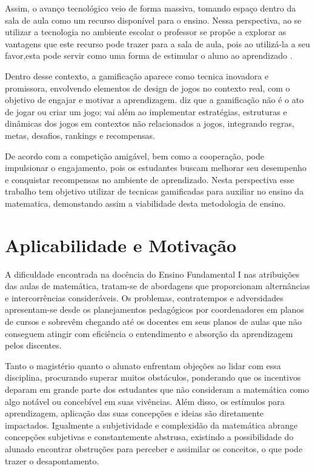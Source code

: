 Assim, o avanço tecnológico veio de forma massiva, tomando espaço dentro da sala de aula como um recurso disponível para o ensino. Nessa perspectiva, ao se utilizar a tecnologia no ambiente escolar o professor se propõe a explorar as vantagens que este recurso pode trazer para a sala de aula, pois ao utilizá-la a seu favor,esta pode servir como uma forma de estimular o aluno ao aprendizado \cite{barbosa2020utilizacao}.

Dentro desse contexto, a gamificação aparece como tecnica inovadora e promissora, envolvendo elementos de design de jogos no contexto real, com o objetivo de engajar e motivar a aprendizagem. \cite{barbosa2021aplicativos} diz que a gamificação não é o ato de jogar ou criar um jogo; vai além ao implementar estratégias, estruturas e dinâmicas dos jogos em contextos não relacionados a jogos, integrando regras, metas, desafios, rankings e recompensas.

De acordo com \cite{santana2024intencionalidade} a competição amigável, bem como a cooperação, pode impulsionar o engajamento, pois os estudantes buscam melhorar seu desempenho e conquistar recompensas no ambiente de aprendizado. Nesta perspectiva esse trabalho tem objetivo utilizar de tecnicas gamificadas para auxiliar no ensino da matematica, demonstando assim a viabilidade desta metodologia de ensino. 

\section{Aplicabilidade e Motivação}\label{chp:aplic}

A dificuldade encontrada na docência do Ensino Fundamental I nas atribuições das aulas de matemática, tratam-se de abordagens que proporcionam alternâncias e intercorrências consideráveis. Os problemas, contratempos e adversidades apresentam-se desde os planejamentos pedagógicos por coordenadores em planos de cursos e sobrevêm chegando até os docentes em seus planos de aulas que não conseguem atingir com eficiência o entendimento e absorção da aprendizagem pelos discentes. 

Tanto o magistério quanto o alunato enfrentam objeções ao lidar com essa disciplina, procurando superar muitos obstáculos, ponderando que os incentivos deparam em grande parte dos estudantes que não consideram a matemática como algo notável ou concebível em suas vivências. Além disso, os estímulos para aprendizagem, aplicação das suas concepções e ideias são diretamente impactados. Igualmente a subjetividade e complexidão da matemática abrange concepções subjetivas e constantemente abstrusa, existindo a possibilidade do alunado encontrar obstruções para perceber e assimilar os conceitos, o que pode trazer o desapontamento. 

